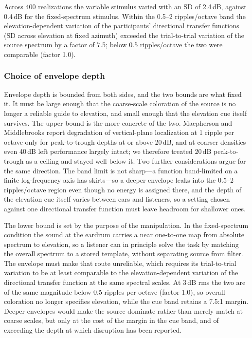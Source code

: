 Across 400 realizations the variable stimulus varied with an SD of 2.4\,dB,
against 0.4\,dB for the fixed-spectrum stimulus. Within the 0.5--2
ripples/octave band the elevation-dependent variation of the participants'
directional transfer functions (SD across elevation at fixed azimuth) exceeded
the trial-to-trial variation of the source spectrum by a factor of 7.5; below
0.5 ripples/octave the two were comparable (factor 1.0).


\subsubsection*{Choice of envelope depth}

Envelope depth is bounded from both sides, and the two bounds are what fixed
it. It must be large enough that the coarse-scale coloration of the source is
no longer a reliable guide to elevation, and small enough that the elevation
cue itself survives. The upper bound is the more concrete of the two.
Macpherson and Middlebrooks
report degradation of vertical-plane localization at 1 ripple per octave only
for peak-to-trough depths at or above 20\,dB, and at coarser densities even
40\,dB left performance largely intact; we therefore treated 20\,dB
peak-to-trough as a ceiling and stayed well below it. Two further
considerations argue for the same direction. The band limit is not sharp---a
function band-limited on a finite log-frequency axis has skirts---so a deeper
envelope leaks into the 0.5--2 ripples/octave region even though no energy is
assigned there, and the depth of the elevation cue itself varies between ears
and listeners, so a setting chosen against one directional transfer function
must leave headroom for shallower ones.

The lower bound is set by the purpose of the manipulation. In the fixed-spectrum
condition the sound at the eardrum carries a near one-to-one map from absolute
spectrum to elevation, so a listener can in principle solve the task by
matching the overall spectrum to a stored template, without separating source
from filter. The envelope must make that route unreliable, which requires its
trial-to-trial variation to be at least comparable to the elevation-dependent
variation of the directional transfer function at the same spectral scales. At
3\,dB rms the two are of the same magnitude below 0.5 ripples per octave
(factor 1.0), so overall coloration no longer specifies elevation, while the
cue band retains a 7.5:1 margin. Deeper envelopes would make the source
dominate rather than merely match at coarse scales, but only at the cost of
the margin in the cue band, and of exceeding the depth at which disruption has
been reported.

